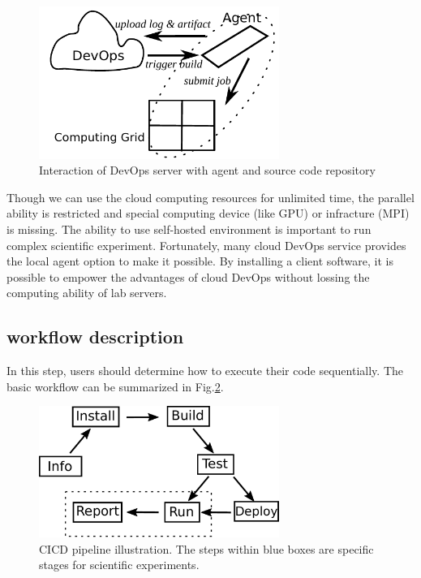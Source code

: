 \documentclass{IEEEcsmag}
\begin{document}
\begin{figure}[!ht]
\centerline{\includegraphics[width=18.5pc]{self-hosted.pdf}}
\caption{Interaction of DevOps server with agent and source code repository}\label{fig:selfhosted}
\end{figure}

Though we can use the cloud computing resources for unlimited time, the parallel ability is restricted and special computing device (like GPU) or infracture (MPI) is missing. The ability to use self-hosted environment is important to run complex scientific experiment. Fortunately, many cloud DevOps service provides the local agent option to make it possible. By installing a client software, it is possible to empower the advantages of cloud DevOps without lossing the computing ability of lab servers. 
\subsection{workflow description}
In this step, users should determine how to execute their code sequentially. The basic workflow can be summarized in Fig.\ref{fig:cicdworkflow}.

\begin{figure}[!ht]
\centerline{\includegraphics[width=18.5pc]{workflow.pdf}}
\caption{CICD pipeline illustration. The steps within blue boxes are specific stages for scientific experiments. }\label{fig:cicdworkflow}
\end{figure}
\end{document}
